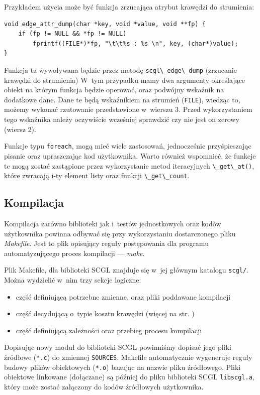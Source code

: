 \documentclass[a4paper,12pt,polish,oneside,openright]{thesis}
\newcommand\code[1]{\lstinline[style=line]{#1}}
\begin{document}
Przykładem użycia może być funkcja zrzucająca atrybut krawędzi do strumienia:
\begin{lstlisting}[style=code,caption=Przykładowa funkcja wykorzystywana przez metodę scgl\_edge\_dump]
void edge_attr_dump(char *key, void *value, void **fp) {
	if (fp != NULL && *fp != NULL)
		fprintf((FILE*)*fp, "\t\t%s : %s \n", key, (char*)value);
}
\end{lstlisting}
Funkcja ta wywoływana będzie przez metodę \code{scgl\_edge\_dump} (zrzucanie krawędzi do strumienia)
W~tym przypadku mamy dwa argumenty określające obiekt na którym funkcja będzie operować, oraz podwójny wskaźnik na dodatkowe dane.
Dane te będą wskaźnikiem na strumień (\code{FILE}), wiedząc to, możemy wykonać rzutowanie przedstawione w~wierszu 3.
Przed wykorzystaniem tego wskaźnika należy oczywiście wcześniej sprawdzić czy nie jest on zerowy (wiersz 2).

Funkcje typu \code{foreach}, mogą mieć wiele zastosowań, jednocześnie przyśpieszając pisanie oraz upraszczając kod użytkownika.
Warto również wspomnieć, że funkcje te mogą zostać zastąpione przez wykorzystanie metod iteracyjnych \code{\_get\_at()}, które zwracają i-ty element listy oraz funkcji \code{\_get\_count}.

\subsection{Kompilacja}
\label{chap:make}
Kompilacja zarówno biblioteki jak i~testów jednostkowych oraz kodów użytkownika powinna odbywać się przy wykorzystaniu dostarczonego pliku \emph{Makefile}.
Jest to plik opisujący reguły postępowania dla programu automatyzującego proces kompilacji --- \emph{make}.

Plik Makefile, dla biblioteki SCGL znajduje się w~jej głównym katalogu \code{scgl/}.
Można wydzielić w~nim trzy sekcje logiczne:
\begin{itemize}
	\item część definiującą potrzebne zmienne, oraz pliki poddawane kompilacji
	\item część decydującą o~typie kosztu krawędzi (więcej na str. \pageref{chap:costtype})
	\item część definiującą zależności oraz przebieg procesu kompilacji
\end{itemize}
Dopisując nowy moduł do biblioteki SCGL powinniśmy dopisać jego pliki źródłowe (\code{*.c}) do zmiennej \code{SOURCES}.
Makefile automatycznie wygeneruje reguły budowy plików obiektowych (\code{*.o}) bazując na nazwie pliku źródłowego.
Pliki obiektowe linkowane (dołączane) są później do pliku biblioteki SCGL \code{libscgl.a}, który może zostać załączony do kodów źródłowych użytkownika.
\end{document}
